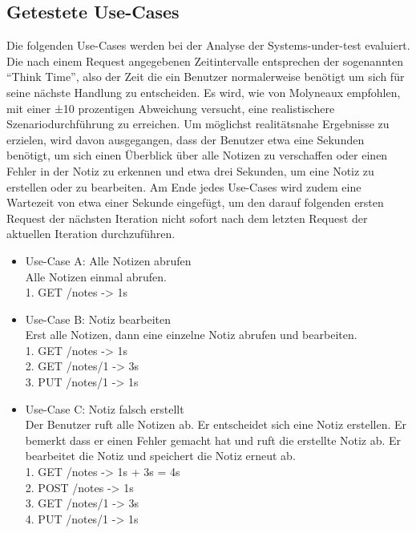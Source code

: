 \subsection{Getestete Use-Cases}\label{sec:use-cases}
Die folgenden Use-Cases werden bei der Analyse der Systems-under-test evaluiert. Die nach einem Request angegebenen Zeitintervalle entsprechen der sogenannten "`Think Time"', also der Zeit die ein Benutzer normalerweise benötigt um sich für seine nächste Handlung zu entscheiden. Es wird, wie von Molyneaux empfohlen, mit einer ±10 prozentigen Abweichung versucht, eine realistischere Szenariodurchführung zu erreichen\cite{molyneaux_art_2014}. Um möglichst realitätsnahe Ergebnisse zu erzielen, wird davon ausgegangen, dass der Benutzer etwa eine Sekunden benötigt, um sich einen Überblick über alle Notizen zu verschaffen oder einen Fehler in der Notiz zu erkennen und etwa drei Sekunden, um eine Notiz zu erstellen oder zu bearbeiten. Am Ende jedes Use-Cases wird zudem eine Wartezeit von etwa einer Sekunde eingefügt, um den darauf folgenden ersten Request der nächsten Iteration nicht sofort nach dem letzten Request der aktuellen Iteration durchzuführen.  
\begin{itemize}
    \item Use-Case A: Alle Notizen abrufen \\
        Alle Notizen einmal abrufen. \\
        1. GET /notes -> 1s     \\

    \item Use-Case B: Notiz bearbeiten \\
        Erst alle Notizen, dann eine einzelne Notiz abrufen und bearbeiten. \\
        1. GET /notes -> 1s     \\
        2. GET /notes/1 -> 3s   \\
        3. PUT /notes/1 -> 1s   \\
        
    \item Use-Case C: Notiz falsch erstellt \\
    Der Benutzer ruft alle Notizen ab. Er entscheidet sich eine Notiz erstellen. Er bemerkt dass er einen Fehler gemacht hat und ruft die erstellte Notiz ab. Er bearbeitet die Notiz und speichert die Notiz erneut ab. \\
        1. GET /notes   -> 1s + 3s = 4s  \\
        2. POST /notes  -> 1s   \\
        3. GET /notes/1 -> 3s   \\
        4. PUT /notes/1 -> 1s   \\
\end{itemize}


